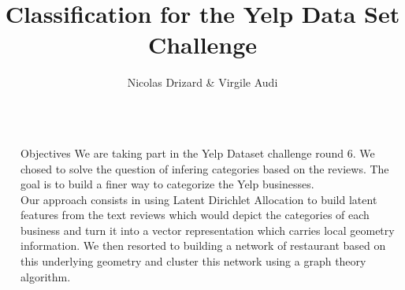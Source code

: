 \documentclass[final]{beamer}
\title{Classification for the Yelp Data Set Challenge} %
\author{Nicolas Drizard \& Virgile Audi} %
\institute{CS281 Final Project, Harvard University} %
\newlength{\sepwid}
\newlength{\onecolwid}
\begin{document}

\setlength{\belowcaptionskip}{2ex} %
\setlength\belowdisplayshortskip{2ex} %

\begin{frame}[t] %

\begin{columns}[t] %

\begin{column}{\sepwid}\end{column} %

\begin{column}{\onecolwid}\vspace{-0.6in} %


\begin{alertblock}{Objectives}
\small
We are taking part in the Yelp Dataset challenge round 6. We chosed to solve the question of infering categories based on the reviews. The goal is to build a finer way to categorize the Yelp businesses.\\

Our approach consists in using Latent Dirichlet Allocation to build latent features from the text reviews which would depict the categories of each business and turn it into a vector representation which carries local geometry information. We then resorted to building a network of restaurant based on this underlying geometry and cluster this network using a graph theory algorithm.\\

\end{alertblock}



\end{column}
\end{columns}
\end{frame}
\end{document}
